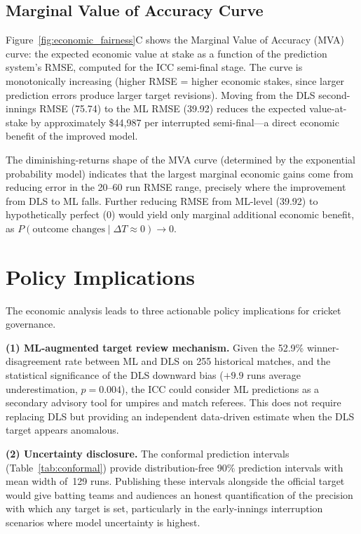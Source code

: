 \documentclass[12pt,a4paper,oneside]{report}
\begin{document}
\subsection{Marginal Value of Accuracy Curve}

Figure~\ref{fig:economic_fairness}C shows the Marginal Value of Accuracy (MVA) curve: the expected economic value at stake as a function of the prediction system's RMSE, computed for the ICC semi-final stage.  The curve is monotonically increasing (higher RMSE = higher economic stakes, since larger prediction errors produce larger target revisions).  Moving from the DLS second-innings RMSE (75.74) to the ML RMSE (39.92) reduces the expected value-at-stake by approximately \$44,987 per interrupted semi-final---a direct economic benefit of the improved model.

The diminishing-returns shape of the MVA curve (determined by the exponential probability model) indicates that the largest marginal economic gains come from reducing error in the 20--60 run RMSE range, precisely where the improvement from DLS to ML falls.  Further reducing RMSE from ML-level (39.92) to hypothetically perfect (0) would yield only marginal additional economic benefit, as $P(\text{outcome changes} \mid \Delta T \approx 0) \to 0$.

\section{Policy Implications}
\label{sec:policy_implications}

The economic analysis leads to three actionable policy implications for cricket governance.

\textbf{(1) ML-augmented target review mechanism.}  Given the 52.9\% winner-disagreement rate between ML and DLS on 255 historical matches, and the statistical significance of the DLS downward bias ($+9.9$ runs average underestimation, $p=0.004$), the ICC could consider ML predictions as a secondary advisory tool for umpires and match referees.  This does not require replacing DLS but providing an independent data-driven estimate when the DLS target appears anomalous.

\textbf{(2) Uncertainty disclosure.}  The conformal prediction intervals (Table~\ref{tab:conformal}) provide distribution-free 90\% prediction intervals with mean width of~129 runs.  Publishing these intervals alongside the official target would give batting teams and audiences an honest quantification of the precision with which any target is set, particularly in the early-innings interruption scenarios where model uncertainty is highest.
\end{document}
